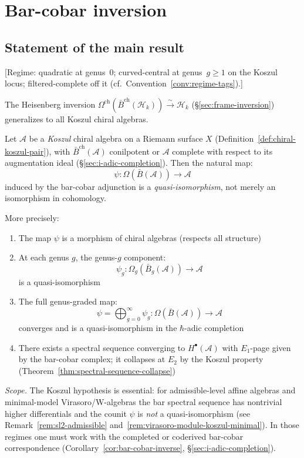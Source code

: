 \section{Bar-cobar inversion}
\label{sec:bar-cobar-inversion-quasi-iso}

\subsection{Statement of the main result}

\begin{theorem}\label{thm:bar-cobar-inversion-qi}
\textup{[Regime: quadratic at genus~$0$; curved-central at genus~$g \geq 1$
on the Koszul locus; filtered-complete off it
\textup{(}cf.\ Convention~\textup{\ref{conv:regime-tags})}.]}

The Heisenberg inversion $\Omega^{\mathrm{ch}}(\bar{B}^{\mathrm{ch}}(\mathcal{H}_k)) \xrightarrow{\sim} \mathcal{H}_k$ (\S\ref{sec:frame-inversion}) generalizes to all Koszul chiral algebras.

Let $\mathcal{A}$ be a \emph{Koszul} chiral algebra on a Riemann surface $X$
(Definition~\ref{def:chiral-koszul-pair}), with
$\bar{B}^{\mathrm{ch}}(\mathcal{A})$ conilpotent or $\mathcal{A}$ complete
with respect to its augmentation ideal
(\S\ref{sec:i-adic-completion}).  Then the natural map:
\[\psi: \Omega(\bar{B}(\mathcal{A})) \longrightarrow \mathcal{A}\]
induced by the bar-cobar adjunction is a \emph{quasi-isomorphism}, not merely
an isomorphism in cohomology.

More precisely:
\begin{enumerate}
\item The map $\psi$ is a morphism of chiral algebras (respects all structure)

\item At each genus $g$, the genus-$g$ component:
      \[\psi_g: \Omega_g(\bar{B}_g(\mathcal{A})) \longrightarrow \mathcal{A}\]
      is a quasi-isomorphism

\item The full genus-graded map:
      \[\psi = \bigoplus_{g=0}^\infty \psi_g: \Omega(\bar{B}(\mathcal{A})) \longrightarrow \mathcal{A}\]
      converges and is a quasi-isomorphism in the $\hbar$-adic completion

\item There exists a spectral sequence converging to $H^\bullet(\mathcal{A})$
      with $E_1$-page given by the bar-cobar complex; it collapses at $E_2$
      by the Koszul property (Theorem~\ref{thm:spectral-sequence-collapse})
\end{enumerate}

\smallskip\noindent\emph{Scope.}
The Koszul hypothesis is essential: for admissible-level affine algebras
and minimal-model Virasoro/W-algebras the bar spectral sequence has
nontrivial higher differentials and the counit $\psi$ is \emph{not} a
quasi-isomorphism (see Remark~\ref{rem:sl2-admissible}
and~\ref{rem:virasoro-module-koszul-minimal}).  In those regimes one must work
with the completed or coderived bar-cobar correspondence
(Corollary~\ref{cor:bar-cobar-inverse},
\S\ref{sec:i-adic-completion}).
\end{theorem}

